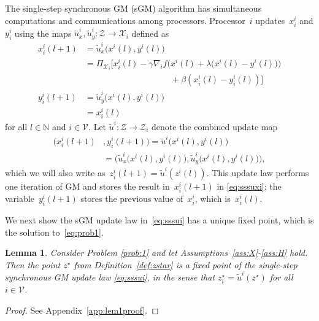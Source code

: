 \documentclass[9pt,shortpaper,twoside,web]{ieeecolor}
\newcommand{\X}{\ensuremath{\mathcal{X}}\xspace}
\newcommand{\Z}{\ensuremath{\mathcal{Z}}\xspace}
\newcommand{\V}{\ensuremath{\mathcal{V}}\xspace}
\newtheorem{lemma}{Lemma}
\begin{document}
The single-step synchronous GM (sGM) algorithm has simultaneous computations and communications among processors. 
Processor~$i$ updates~$x^i_i$ and $y^i_i$ using the maps $\tilde{u}^i_x,\tilde{u}^i_y:\Z\rightarrow \X_i$ defined as
\begin{align}
    x^i_i(l+1) &= \tilde{u}^i_x\big(x^i(l),y^i(l)\big)  \label{eq:sssuxi}
    \\ &= \Pi_{\X_i}\Big[x^i_i(l) - \gamma\nabla_i f\Big(x^i(l)+\lambda\big(x^i(l)-y^i(l)\big)\Big) 
    \\ &\qquad\qquad\qquad\qquad\qquad + \beta(x^i_i(l)-y^i_i(l))\Big]
    \\y^i_i(l+1) &= \tilde{u}^i_y\big(x^i(l),y^i(l)\big) \label{eq:sssuyi}
    \\ &= x^i_i(l)
\end{align}
for all $l\in\mathbb{N}$ and $i\in \V$.
Let $\tilde{u}^i:\Z\rightarrow \Z_i$ %
denote the combined update map
\begin{align} \label{eq:sssui}
    \big(x^i_i(l+1)&,y^i_i(l+1)\big) = \tilde{u}^i\big(x^i(l),y^i(l)\big)
    \\ &= \Big(\tilde{u}^i_x\big(x^i(l),y^i(l)\big), \tilde{u}^i_y\big(x^i(l),y^i(l)\big)\Big),
\end{align}
which we will also write as~$z^i_i(l+1) = \tilde{u}^i(z^i(l))$. %
This update law performs one iteration of GM and stores the result in~$x^i_i(l+1)$ in \eqref{eq:sssuxi}; 
the variable~$y^i_i(l+1)$ stores the previous value of~$x^i_i$, which is~$x^i_i(l)$. 

We next show the sGM update law in~\eqref{eq:sssui} has a unique fixed point, which is the solution to~\eqref{eq:prob1}.

\begin{lemma}\label{lem:sssFP}
    Consider Problem \ref{prob:1} and let Assumptions~\ref{ass:X}-\ref{ass:H} hold. 
    Then the point $z^\star$ from Definition~\ref{def:zstar}
    is a fixed point of the single-step synchronous GM update law \eqref{eq:sssui}, 
    in the sense that $z^\star_i = \tilde{u}^i(z^\star)$ for all $i\in \V$.
\end{lemma}
\begin{proof}
    See Appendix~\ref{app:lem1proof}. 
\end{proof}
\end{document}
